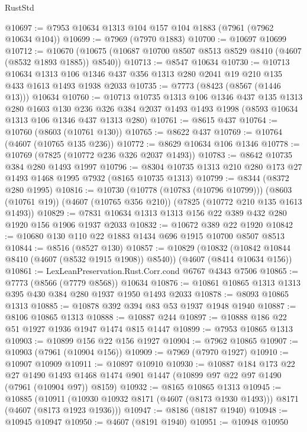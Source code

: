 \begin{lexlean}{RustStd}
\begin{coremodule}
@10697 := @7953 @10634 @1313 @104 @157 @104 @1883 (@7961 (@7962 @10634 @104))
@10699 := @7969 (@7970 @1883)
@10700 := @10697 @10699
@10712 := @10670 (@10675 (@10687 @10700 @8507 @8513 @8529 @8410 (@4607 (@8532 @1893 @1885)) @8540))
@10713 := @8547 @10634
@10730 := @10713
    @10634
    @1313
    @106
    @1346
    @437
    @356
    @1313
    @280
    @2041
    @19
    @210
    @135
    @433
    @1613
    @1493
    @1938
    @2033
@10735 := @7773 (@8423 (@8567 (@1446 @13))) @10634
@10760 := @10713
    @10735
    @1313
    @106
    @1346
    @437
    @135
    @1313
    @280
    @1603
    @130
    @236
    @326
    @384
    @2037
    @1493
    @1493
    @1998
    (@8593 @10634 @1313 @106 @1346 @437 @1313 @280)
@10761 := @8615 @437
@10764 := @10760 (@8603 (@10761 @130))
@10765 := @8622 @437
@10769 := @10764 (@4607 (@10765 @135 @236))
@10772 := @8629 @10634 @106 @1346
@10778 := @10769 (@7825 (@10772 @236 @326 @2037 @1493))
@10783 := @8642 @10735 @384 @280 @1493 @1997
@10796 := @8304 @10735 @1313 @210 @280 @173 @27 @1493 @1468 @1995 @7932 (@8165 @10735 @1313)
@10799 := @8344 (@8372 @280 @1995)
@10816 := @10730
    (@10778 (@10783 (@10796 @10799)))
    (@8603 (@10761 @19))
    (@4607 (@10765 @356 @210))
    (@7825 (@10772 @210 @135 @1613 @1493))
@10829 := @7831 @10634 @1313 @1313 @156 @22 @389 @432 @280 @1920 @156 @1906 @1937 @2033
@10832 := @10672 @389 @22 @1920
@10842 := @10680 @130 @110 @22 @1883 @1434 @696 @1915 @10700 @8507 @8513
@10844 := @8516 (@8527 @130)
@10857 := @10829
    (@10832 (@10842 @10844 @8410 (@4607 (@8532 @1915 @1908)) @8540))
    (@4607 (@8414 @10634 @156))
@10861 := LexLeanPreservation.Rust.Corr.cond @6767 @4343 @7506
@10865 := @7773 (@8566 (@7779 @8568)) @10634
@10876 := @10861 @10865 @1313 @1313 @395 @430 @384 @280 @1937 @1950 @1493 @2033
@10878 := @8093 @10865 @1313
@10885 := @10878 @392 @394 @83 @53 @1937 @1948 @1940
@10887 := @8106 @10865 @1313
@10888 := @10887 @244
@10897 := @10888 @186 @22 @51 @1927 @1936 @1947 @1474 @815 @1447
@10899 := @7953 @10865 @1313
@10903 := @10899 @156 @22 @156 @1927
@10904 := @7962 @10865
@10907 := @10903 (@7961 (@10904 @156))
@10909 := @7969 (@7970 @1927)
@10910 := @10907 @10909
@10911 := @10897 @10910
@10930 := @10887
    @184
    @173
    @22
    @27
    @1490
    @1493
    @1468
    @1474
    @901
    @1447
    (@10899 @97 @22 @97 @1490 (@7961 (@10904 @97)) @8159)
@10932 := @8165 @10865 @1313
@10945 := @10885
    (@10911 (@10930 @10932 @8171 (@4607 (@8173 @1930 @1493))) @8171 (@4607 (@8173 @1923 @1936)))
@10947 := @8186 (@8187 @1940)
@10948 := @10945 @10947
@10950 := @4607 (@8191 @1940)
@10951 := @10948 @10950

\end{coremodule}
\end{lexlean}
